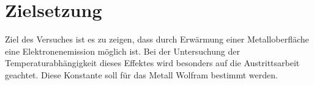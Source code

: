 \section{Zielsetzung}
\label{sec:zielsetzung}
Ziel des Versuches ist es zu zeigen, dass durch Erwärmung einer Metalloberfläche eine Elektronenemission 
möglich ist. Bei der Untersuchung der Temperaturabhängigkeit dieses Effektes wird besonders auf die Austrittsarbeit 
geachtet. Diese Konstante soll für das Metall Wolfram bestimmt werden.
